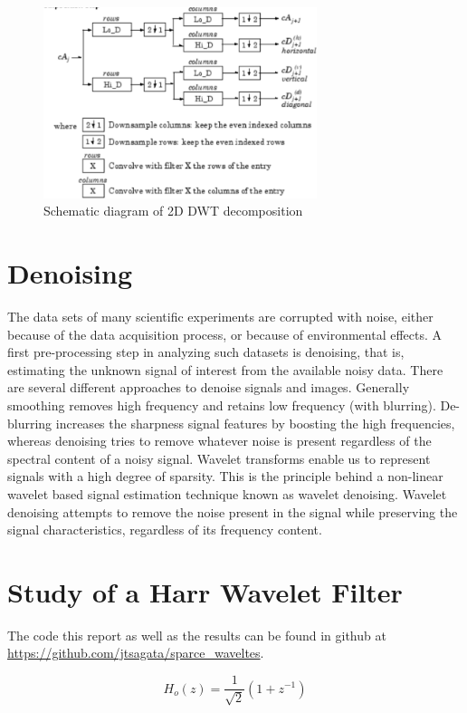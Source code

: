 \documentclass[a4paper,12pt]{article}
\begin{document}
\begin{figure}[]
        \centering
        \includegraphics[width=8cm]{diagram2.png}
        \caption{Schematic diagram of 2D DWT decomposition}
		\label{fig:wave2}
\end{figure}


\section {Denoising}
The data sets of many scientific experiments are corrupted with noise, either because of the data acquisition process, or because of environmental effects. A first pre-processing step in analyzing such datasets is denoising, that is, estimating the unknown signal of interest from the available noisy data. There are several different approaches to denoise signals and images. Generally smoothing removes high frequency and retains low frequency (with blurring). De-blurring increases the sharpness signal features by boosting the high frequencies, whereas denoising tries to remove whatever noise is present regardless of the spectral content of a noisy signal. Wavelet transforms enable us to represent signals with a high degree of sparsity. This is the principle behind a non-linear wavelet based signal estimation technique known as wavelet denoising. Wavelet denoising attempts to remove the noise present in the signal while preserving the signal characteristics, regardless of its frequency content.

\section{Study of a Harr Wavelet Filter}
The code this report as well as the results can be found in  github at \url{https://github.com/jtsagata/sparce_waveltes}.

$$
H_o(z) = \frac{1}{\sqrt{2}}\left( 1 + z^{-1}\right)
$$
\end{document}
